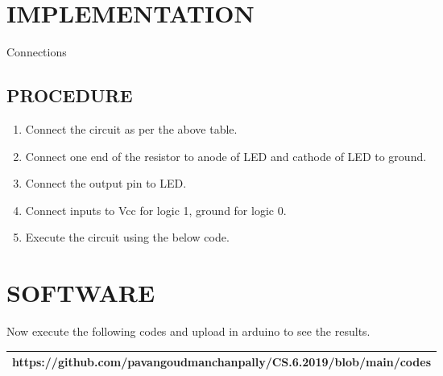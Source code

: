 \documentclass{article}
\begin{document}
\section{IMPLEMENTATION}
  \begin{table}[ht!]
    \centering	  
  
  \caption{Connections} 
  \label{Table:Connections}
  \end{table}
\bigskip

\subsection{PROCEDURE}
\begin{enumerate} 
\item Connect the circuit as per the above table.
\item Connect one end of the resistor to anode of LED and cathode of LED to ground.
\item Connect the output pin to LED.
\item Connect inputs to Vcc for logic 1, ground for logic 0.
\item Execute the circuit using the below code.
\end{enumerate}

\section{SOFTWARE}
  Now execute the following codes and upload in arduino to see the results.\\


\begin{tabularx}{1.25\textwidth} { 
  | >{\centering\arraybackslash}X |}
  \hline
  https://github.com/pavangoudmanchanpally/CS.6.2019/blob/main/codes\\
  \hline
\end{tabularx}

\end{document}

